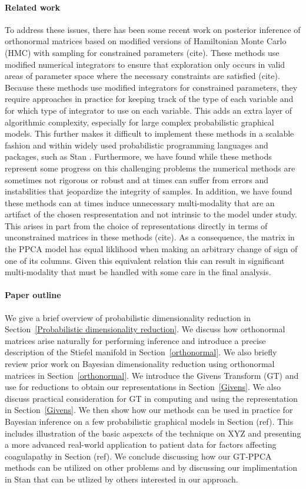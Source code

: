 \documentclass{article}
\begin{document}
\paragraph{Related work} To address these issues, there has been some recent work on posterior inference of orthonormal matrices based on modified versions of Hamiltonian Monte Carlo (HMC) with sampling for constrained parameters (cite).  These methods use modified numerical integrators to ensure that exploration only occurs in valid areas of parameter space where the necessary constraints are satisfied (cite).  Because these methods use modified integrators for constrained parameters, they require approaches in practice for keeping track of the type of each variable and for which type of integrator to use on each variable. This adds an extra layer of algorithmic complexity, especially for large complex probabilistic graphical models.  This further makes it difficult to implement these methods in a scalable fashion and within widely used probabilistic programming languages and packages, such as Stan \citep{carpenter2016stan}. Furthermore, we have found while these methods represent some progress on this challenging problems the numerical methods are sometimes not rigorous or robust and at times can suffer from errors and instabilities that jeopardize the integrity of samples.  In addition, we have found these methods can at times induce unnecessary multi-modality that are an artifact of the chosen respresentation and not intrinsic to the model under study.  This arises in part from the choice of representations directly in terms of unconstrained matrices in these methods (cite).  As a consequence, the matrix in the PPCA model has equal liklihood when making an arbitrary change of sign of one of its columns.  Given this equivalent relation this can result in significant multi-modality that must be handled with some care in the final analysis.

\paragraph{Paper outline} We give a brief overview of probabilistic dimensionality reduction in Section~\ref{Probabilistic dimensionality reduction}.  We discuss how orthonormal matrices arise naturally for performing inference and introduce a precise description of the Stiefel manifold in Section~\ref{orthonormal}.  We also briefly review prior work on 
Bayesian dimensionality reduction using orthonormal matrices in Section~\ref{orthonormal}.  We introduce the Givens Transform (GT) and use for reductions to obtain our representations in Section~\ref{Givens}.  We also discuss practical consideration for GT in computing and using the representation in Section~\ref{Givens}.  We then show how our methods can be used in practice for Bayesian inference on a few probabilistic graphical models in Section (ref).  This includes illustration of the basic aspexcts of the technique on XYZ and presenting a more advanced real-world application to patient data for factors affecting coagulapathy in Section (ref).  We conclude discussing how our GT-PPCA methods can be utilized on other problems and by discussing our implimentation in Stan that can be utlized by others interested in our approach.
\end{document}
